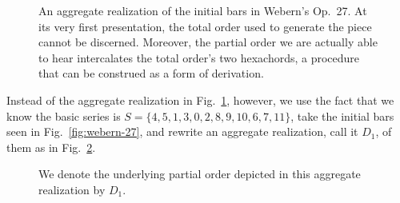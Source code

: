 \begin{example}
    \begin{figure}[htbp]
    	\centering
		\caption[Aggregate Realization of Bars 1--7 in Webern's Op.~27]{An aggregate realization of the initial bars in Webern's Op.~27. At its very first presentation, the total order used to generate the piece cannot be discerned. Moreover, the partial order we are actually able to hear intercalates the total order's two hexachords, a procedure that can be construed as a form of derivation.}
    	\label{fig:webern-aggregate}
	\end{figure}

	\noindent Instead of the aggregate realization in Fig.~\ref{fig:webern-aggregate}, however, we use the fact that we know the basic series is $S = \{ 4, 5, 1, 3, 0, 2, 8, 9, 10, 6, 7, 11 \}$, take the initial bars seen in Fig.~\ref{fig:webern-27}, and rewrite an aggregate realization, call it $D_1$, of them as in Fig.~\ref{fig:webern-aggregate-b}.

	\begin{figure}[htbp]
    	\centering
    	\caption[Another Aggregate Realization of Bars 1--7 in Webern's Op.~27]{We denote the underlying partial order depicted in this aggregate realization by $D_1$.}
    	\label{fig:webern-aggregate-b}
	\end{figure}


\end{example}
